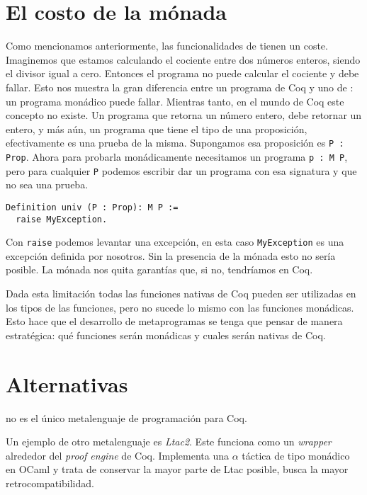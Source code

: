 \section{El costo de la mónada}

Como mencionamos anteriormente, las funcionalidades de \Mtac tienen un coste.
Imaginemos que estamos calculando el cociente entre dos números enteros, siendo el divisor igual a cero.
Entonces el programa no puede calcular el cociente y debe fallar.
Esto nos muestra la gran diferencia entre un programa de Coq y uno de \mtac: un programa monádico puede fallar.
Mientras tanto, en el mundo de Coq este concepto no existe.
Un programa que retorna un número entero, debe retornar un entero, y más aún, un programa que tiene el tipo de una proposición, efectivamente es una prueba de la misma.
Supongamos esa proposición es \lstinline{P : Prop}.
Ahora para probarla monádicamente necesitamos un programa \lstinline{p : M P}, pero para cualquier \lstinline{P} podemos escribir dar un programa con esa signatura y que no sea una prueba.

\begin{lstlisting}
Definition univ (P : Prop): M P :=
  raise MyException.
\end{lstlisting}

Con \lstinline{raise} podemos levantar una excepción, en esta caso \lstinline{MyException} es una excepción definida por nosotros.
Sin la presencia de la mónada esto no sería posible.
La mónada nos quita garantías que, si no, tendríamos en Coq.

Dada esta limitación todas las funciones nativas de Coq pueden ser utilizadas en los tipos de las funciones, pero no sucede lo mismo con las funciones monádicas.
Esto hace que el desarrollo de metaprogramas se tenga que pensar de manera estratégica: qué funciones serán monádicas y cuales serán nativas de Coq.

\section{Alternativas}

\Mtac no es el único metalenguaje de programación para Coq. 

Un ejemplo de otro metalenguaje es \emph{Ltac2}.
Este funciona como un \emph{wrapper} alrededor del \emph{proof engine} de Coq.
Implementa una $\alpha$ táctica de tipo monádico en OCaml y trata de conservar la mayor parte de Ltac posible, busca la mayor retrocompatibilidad.

